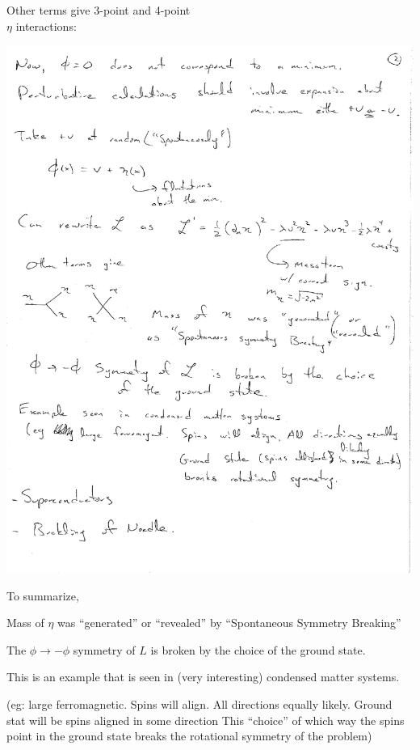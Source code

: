 {\begin{minipage}{0.5\textwidth}
Other terms give 3-point and 4-point\\
 $\eta$ interactions:
\end{minipage} \hfill
\begin{minipage}{0.5\textwidth}
\includegraphics[width=1.0\textwidth]{./etaInteractions.pdf}
\end{minipage}

To summarize,
\bi
\item[-] Mass of $\eta$ was ``generated'' or ``revealed'' by ``Spontaneous Symmetry Breaking'' 
\item[-] The $\phi \rightarrow -\phi$ symmetry of $L$ is broken by the choice of the ground state.
\ei

This is an example that is seen in (very interesting) condensed matter systems. 

(eg: large ferromagnetic. 
Spins will align.  
All directions equally likely. 
Ground stat will be spins aligned in some direction
This ``choice'' of which way the spins point in the ground state breaks the rotational symmetry of the problem)


}
